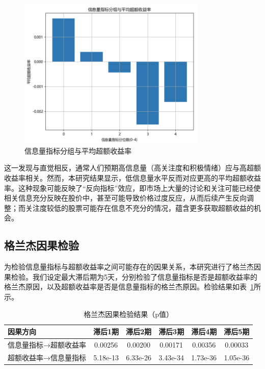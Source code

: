 \documentclass[12pt, a4paper]{article}
\begin{document}
\begin{figure}[htbp]
\centering
\includegraphics[width=0.8\textwidth]{fig/group_analysis.png}
\caption{信息量指标分组与平均超额收益率}
\label{fig:group_analysis}
\end{figure}

这一发现与直觉相反，通常人们预期高信息量（高关注度和积极情绪）应与高超额收益率相关。然而，本研究结果显示，低信息量水平反而对应更高的平均超额收益率。这种现象可能反映了“反向指标”效应，即市场上大量的讨论和关注可能已经使相关信息充分反映在股价中，甚至可能导致价格过度反应，从而后续产生反向调整；而关注度较低的股票可能存在信息不充分的情况，蕴含更多获取超额收益的机会。

\subsection{格兰杰因果检验}

为检验信息量指标与超额收益率之间可能存在的因果关系，本研究进行了格兰杰因果检验。我们设定最大滞后期为5天，分别检验了信息量指标是否是超额收益率的格兰杰原因，以及超额收益率是否是信息量指标的格兰杰原因。检验结果如表~\ref{tab:granger_causality}所示。

\begin{table}[htbp]
\centering
\caption{格兰杰因果检验结果（p值）}
\label{tab:granger_causality}
\begin{tabular}{lccccc}
\toprule
因果方向 & 滞后1期 & 滞后2期 & 滞后3期 & 滞后4期 & 滞后5期 \\
\midrule
信息量指标→超额收益率 & 0.00256 & 0.00200 & 0.00171 & 0.00356 & 0.00033 \\
超额收益率→信息量指标 & 5.18e-13 & 6.33e-26 & 3.43e-34 & 1.73e-36 & 1.05e-36 \\
\bottomrule
\end{tabular}
\end{table}
\end{document}
